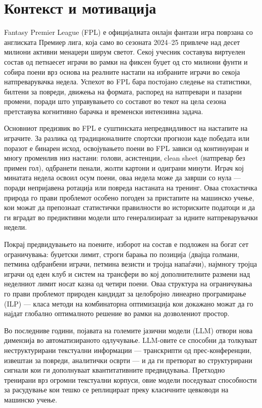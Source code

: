 
\section{Контекст и мотивација}

Fantasy Premier League (FPL) е официјалната онлајн фантази игра поврзана со англиската Премиер лига, која само во сезоната 2024--25 привлече над десет милиони активни менаџери ширум светот. Секој учесник составува виртуелен состав од петнаесет играчи во рамки на фиксен буџет од сто милиони фунти и собира поени врз основа на реалните настапи на избраните играчи во секоја натпреварувачка недела. Успехот во FPL бара постојано следење на статистики, билтени за повреди, движења на формата, распоред на натпревари и пазарни промени, поради што управувањето со составот во текот на цела сезона претставува когнитивно барачка и временски интензивна задача.

Основниот предизвик во FPL е суштинската непредвидливост на настапите на играчите. За разлика од традиционалните спортски прогнози каде победата или поразот е бинарен исход, освојувањето поени во FPL зависи од континуиран и многу променлив низ настани: голови, асистенции, clean sheet (натпревар без примен гол), одбранети пенали, жолти картони и одиграни минути. Играч кој минатата недела освоил осум поени, оваа недела може да заврши со нула — поради непријавена ротација или повреда настаната на тренинг. Оваа стохастичка природа го прави проблемот особено погоден за пристапите на машинско учење, кои можат да препознаат статистички правилности во историските податоци и да ги вградат во предиктивни модели што генерализираат за идните натпреварувачки недели.

Покрај предвидувањето на поените, изборот на состав е подложен на богат сет ограничувања: буџетски лимит, строги барања по позиција (двајца голмани, петмина одбранбени играчи, петмина везисти и тројца напаѓачи), најмногу тројца играчи од еден клуб и систем на трансфери во кој дополнителните размени над неделниот лимит носат казна од четири поени. Оваа структура на ограничувања го прави проблемот природен кандидат за целобројно линеарно програмирање (ILP) — класа методи на комбинаторна оптимизација кои докажано можат да го најдат глобално оптималното решение во рамки на дозволениот простор.

Во последниве години, појавата на големите јазични модели (LLM) отвори нова димензија во автоматизираното одлучување. LLM-овите се способни да толкуваат неструктурирани текстуални информации — транскрипти од прес-конференции, извештаи за повреди, аналитички осврти — и да ги претворат во структурирани сигнали кои ги дополнуваат квантитативните предвидувања. Претходно тренирани врз огромни текстуални корпуси, овие модели поседуваат способности за расудување кои тешко се реплицираат преку класичните цевководи на машинско учење.

